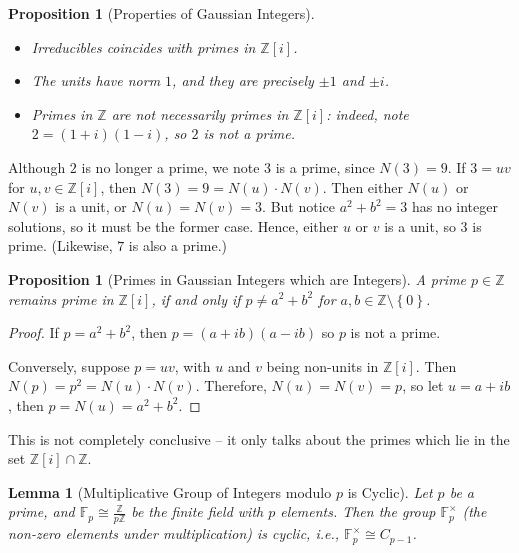 \documentclass{article}
\newtheorem{lemma}[theorem]{Lemma}
\newtheorem{proposition}[theorem]{Proposition}
\theoremstyle{definition}
\theoremstyle{remark}
\newcommand{\pqty}[1]{\left(#1\right)}
\newcommand{\bqty}[1]{\left[#1\right]}
\newcommand{\Bqty}[1]{\left\{#1\right\}}
\newcommand{\flatfrac}[2]{\frac{#1}{#2}}
\newcommand{\multiplicative}{^{\times}}
\newcommand{\isomorphic}{\cong}
\newcommand{\ZZ}{\mathbb{Z}}
\newcommand{\FF}{\mathbb{F}}
\begin{document}
\begin{proposition}[Properties of Gaussian Integers]
    \label{prop:properties-gaussian-integers}%
    \begin{itemize}
        \item Irreducibles coincides with primes in \(\ZZ\bqty{i}\).
        \item The units have norm \(1\), and they are precisely \(\pm 1\) and \(\pm i\).
        \item Primes in \(\ZZ\) are \emph{not necessarily} primes in \(\ZZ\bqty{i}\): indeed, note \(2 = \pqty{1 + i} \pqty{1 - i}\), so \(2\) is not a prime.    
    \end{itemize}
\end{proposition}

Although \(2\) is no longer a prime, we note \(3\) is a prime, since \(N\pqty{3} = 9\). If \(3 = uv\) for \(u, v \in \ZZ\bqty{i}\), then \(N\pqty{3} = 9 = N\pqty{u} \cdot N\pqty{v}\). Then either \(N\pqty{u}\) or \(N\pqty{v}\) is a unit, or \(N\pqty{u} = N\pqty{v} = 3\). But notice \(a^2 + b^2 = 3\) has no integer solutions, so it must be the former case. Hence, either \(u\) or \(v\) is a unit, so \(3\) is prime. (Likewise, \(7\) is also a prime.)

\begin{proposition}[Primes in Gaussian Integers which are Integers]
    \label{prop:prime-gaussian-int-int}%
    A prime \(p \in \ZZ\) remains prime in \(\ZZ\bqty{i}\), if and only if \(p \neq a^2 + b^2\) for \(a, b \in \ZZ \setminus \Bqty{0}\).
\end{proposition}

\begin{proof}
    If \(p = a^2 + b^2\), then \(p = \pqty{a + ib} \pqty{a - ib}\) so \(p\) is not a prime.

    Conversely, suppose \(p = uv\), with \(u\) and \(v\) being non-units in \(\ZZ\bqty{i}\). Then \(N\pqty{p} = p^2 = N\pqty{u} \cdot N\pqty{v}\). Therefore, \(N\pqty{u} = N\pqty{v} = p\), so let \(u = a + ib\), then \(p = N\pqty{u} = a^2 + b^2\).
\end{proof} 

This is not completely conclusive -- it only talks about the primes which lie in the set \(\ZZ\bqty{i} \cap \ZZ\).

\begin{lemma}[Multiplicative Group of Integers modulo \(p\) is Cyclic]
    \label{lem:multiplicative-group-int-mod-p-cyclic}%
    Let \(p\) be a prime, and \(\FF_p \isomorphic \flatfrac{\ZZ}{p \ZZ}\) be the finite field with \(p\) elements. Then the group \(\FF_p\multiplicative\) (the non-zero elements under multiplication) is cyclic, i.e., \(\FF_p\multiplicative \isomorphic C_{p - 1}\).
\end{lemma}
\end{document}
